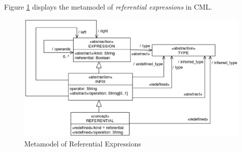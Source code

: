 Figure \ref{fig:meta:referential-expr} displays the metamodel of
\emph{referential expressions} in CML.

\begin{figure}[H]
\centering
\includegraphics[width=1.2\textwidth]{metamodel/referential-expr}
\caption{Metamodel of Referential Expressions}
\label{fig:meta:referential-expr}
\end{figure}
